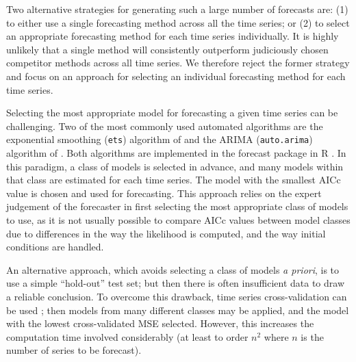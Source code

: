\documentclass[11pt,a4paper,]{article}
\begin{document}
Two alternative strategies for generating such a large number of forecasts are: (1) to either use a single forecasting method across all the time series; or (2) to select an appropriate forecasting method for each time series individually. It is highly unlikely that a single method will consistently outperform judiciously chosen competitor methods across all time series. We therefore reject the former strategy and focus on an approach for selecting an individual forecasting method for each time series.

Selecting the most appropriate model for forecasting a given time series can be challenging. Two of the most commonly used automated algorithms are the exponential smoothing (\texttt{ets}) algorithm of \textcite{Hyndman2002} and the ARIMA (\texttt{auto.arima}) algorithm of \textcite{Hyndman2008}. Both algorithms are implemented in the forecast package in R \autocites{Rcore}{forecast}. In this paradigm, a class of models is selected in advance, and many models within that class are estimated for each time series. The model with the smallest AICc value is chosen and used for forecasting. This approach relies on the expert judgement of the forecaster in first selecting the most appropriate class of models to use, as it is not usually possible to compare AICc values between model classes due to differences in the way the likelihood is computed, and the way initial conditions are handled.

An alternative approach, which avoids selecting a class of models \emph{a priori}, is to use a simple ``hold-out'' test set; but then there is often insufficient data to draw a reliable conclusion. To overcome this drawback, time series cross-validation can be used \autocite{hyndman2014forecasting}; then models from many different classes may be applied, and the model with the lowest cross-validated MSE selected. However, this increases the computation time involved considerably (at least to order \(n^2\) where \(n\) is the number of series to be forecast).
\end{document}
